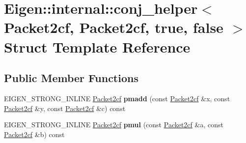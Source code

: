 \hypertarget{struct_eigen_1_1internal_1_1conj__helper_3_01_packet2cf_00_01_packet2cf_00_01true_00_01false_01_4}{}\section{Eigen\+:\+:internal\+:\+:conj\+\_\+helper$<$ Packet2cf, Packet2cf, true, false $>$ Struct Template Reference}
\label{struct_eigen_1_1internal_1_1conj__helper_3_01_packet2cf_00_01_packet2cf_00_01true_00_01false_01_4}
\subsection*{Public Member Functions}
\begin{DoxyCompactItemize}
\item 
\mbox{\label{struct_eigen_1_1internal_1_1conj__helper_3_01_packet2cf_00_01_packet2cf_00_01true_00_01false_01_4_adf96b24cdfcc9e3616d67c6f16da9920}} 
E\+I\+G\+E\+N\+\_\+\+S\+T\+R\+O\+N\+G\+\_\+\+I\+N\+L\+I\+NE \hyperlink{struct_eigen_1_1internal_1_1_packet2cf}{Packet2cf} {\bfseries pmadd} (const \hyperlink{struct_eigen_1_1internal_1_1_packet2cf}{Packet2cf} \&x, const \hyperlink{struct_eigen_1_1internal_1_1_packet2cf}{Packet2cf} \&y, const \hyperlink{struct_eigen_1_1internal_1_1_packet2cf}{Packet2cf} \&c) const
\item 
\mbox{\label{struct_eigen_1_1internal_1_1conj__helper_3_01_packet2cf_00_01_packet2cf_00_01true_00_01false_01_4_a09374613c0b962776ac245738c43f36b}} 
E\+I\+G\+E\+N\+\_\+\+S\+T\+R\+O\+N\+G\+\_\+\+I\+N\+L\+I\+NE \hyperlink{struct_eigen_1_1internal_1_1_packet2cf}{Packet2cf} {\bfseries pmul} (const \hyperlink{struct_eigen_1_1internal_1_1_packet2cf}{Packet2cf} \&a, const \hyperlink{struct_eigen_1_1internal_1_1_packet2cf}{Packet2cf} \&b) const
\item 
\mbox{\label{struct_eigen_1_1internal_1_1conj__helper_3_01_packet2cf_00_01_packet2cf_00_01true_00_01false_01_4_adf96b24cdfcc9e3616d67c6f16da9920}} 

\end{DoxyCompactItemize}
